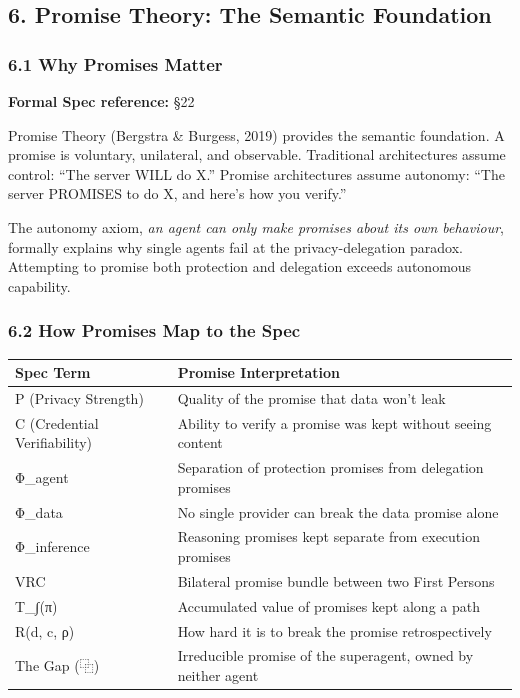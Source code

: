 \documentclass[
  11pt,
]{article}
\newcounter{none} %
\begin{document}
\subsection{6. Promise Theory: The Semantic
Foundation}\label{promise-theory-the-semantic-foundation}

\subsubsection{6.1 Why Promises Matter}\label{why-promises-matter}

\textbf{Formal Spec reference:} §22

Promise Theory (Bergstra \& Burgess, 2019) provides the semantic
foundation. A promise is voluntary, unilateral, and observable.
Traditional architectures assume control: ``The server WILL do X.''
Promise architectures assume autonomy: ``The server PROMISES to do X,
and here's how you verify.''

The autonomy axiom, \emph{an agent can only make promises about its own
behaviour}, formally explains why single agents fail at the
privacy-delegation paradox. Attempting to promise both protection and
delegation exceeds autonomous capability.

\subsubsection{6.2 How Promises Map to the
Spec}\label{how-promises-map-to-the-spec}

{\def\LTcaptype{none} %
\begin{longtable}[]{@{}
  >{\raggedright\arraybackslash}p{}
  >{\raggedright\arraybackslash}p{}@{}}
\toprule\noalign{}
\begin{minipage}[b]{\linewidth}\raggedright
Spec Term
\end{minipage} & \begin{minipage}[b]{\linewidth}\raggedright
Promise Interpretation
\end{minipage} \\
\midrule\noalign{}
\endhead
\bottomrule\noalign{}
\endlastfoot
P (Privacy Strength) & Quality of the promise that data won't leak \\
C (Credential Verifiability) & Ability to verify a promise was kept
without seeing content \\
Φ\_agent & Separation of protection promises from delegation promises \\
Φ\_data & No single provider can break the data promise alone \\
Φ\_inference & Reasoning promises kept separate from execution
promises \\
VRC & Bilateral promise bundle between two First Persons \\
T\_∫(π) & Accumulated value of promises kept along a path \\
R(d, c, ρ) & How hard it is to break the promise retrospectively \\
The Gap (⿻) & Irreducible promise of the superagent, owned by neither
agent \\
\end{longtable}
}
\end{document}
